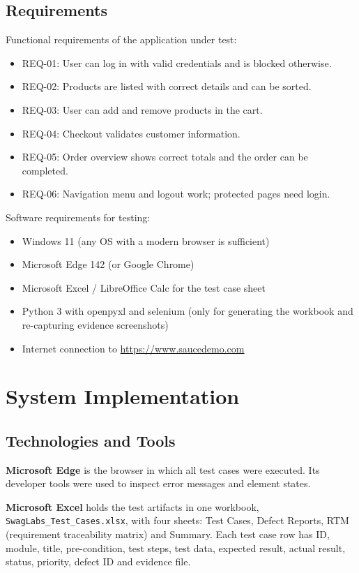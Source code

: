 \documentclass[12pt,a4paper]{article}
\begin{document}
\subsection{Requirements}\label{sec:srs3}
Functional requirements of the application under test:
\begin{itemize}[nosep]
  \item REQ-01: User can log in with valid credentials and is blocked otherwise.
  \item REQ-02: Products are listed with correct details and can be sorted.
  \item REQ-03: User can add and remove products in the cart.
  \item REQ-04: Checkout validates customer information.
  \item REQ-05: Order overview shows correct totals and the order can be completed.
  \item REQ-06: Navigation menu and logout work; protected pages need login.
\end{itemize}
Software requirements for testing:
\begin{itemize}[nosep]
  \item Windows 11 (any OS with a modern browser is sufficient)
  \item Microsoft Edge 142 (or Google Chrome)
  \item Microsoft Excel / LibreOffice Calc for the test case sheet
  \item Python 3 with openpyxl and selenium (only for generating the workbook and re-capturing evidence screenshots)
  \item Internet connection to \url{https://www.saucedemo.com}
\end{itemize}

\section{System Implementation}\label{sec:impl}
\subsection{Technologies and Tools}\label{sec:impl1}
\textbf{Microsoft Edge} is the browser in which all test cases were executed. Its developer tools were used to inspect error messages and element states.

\textbf{Microsoft Excel} holds the test artifacts in one workbook, \texttt{SwagLabs\_Test\_Cases.xlsx}, with four sheets: Test Cases, Defect Reports, RTM (requirement traceability matrix) and Summary. Each test case row has ID, module, title, pre-condition, test steps, test data, expected result, actual result, status, priority, defect ID and evidence file.
\end{document}
